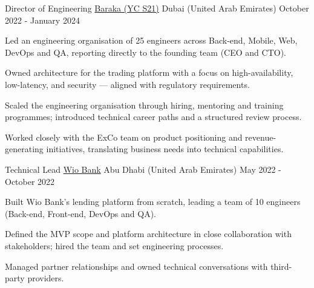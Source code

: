 \begin{cventries}
  \cventry
    {Director of Engineering} %
    {\href{https://getbaraka.com}{Baraka (YC S21)}} %
    {Dubai (United Arab Emirates)} %
    {October 2022 - January 2024} %
    {
      \begin{cvitems} %
        \item[] Led an engineering organisation of 25 engineers across Back-end, Mobile, Web, DevOps and QA, reporting directly to the founding team (CEO and CTO).
        \item[]
        \item[] Owned architecture for the trading platform with a focus on high-availability, low-latency, and security — aligned with regulatory requirements.
        \item[]
        \item[] Scaled the engineering organisation through hiring, mentoring and training programmes; introduced technical career paths and a structured review process.
        \item[]
        \item[] Worked closely with the ExCo team on product positioning and revenue-generating initiatives, translating business needs into technical capabilities.
      \end{cvitems}
    }

  \cventry
    {Technical Lead} %
    {\href{https://wio.io}{Wio Bank}} %
    {Abu Dhabi (United Arab Emirates)} %
    {May 2022 - October 2022} %
    {
      \begin{cvitems} %
        \item[] Built Wio Bank's lending platform from scratch, leading a team of 10 engineers (Back-end, Front-end, DevOps and QA).
        \item[]
        \item[] Defined the MVP scope and platform architecture in close collaboration with stakeholders; hired the team and set engineering processes.
        \item[]
        \item[] Managed partner relationships and owned technical conversations with third-party providers.
      \end{cvitems}
    }


\end{cventries}
